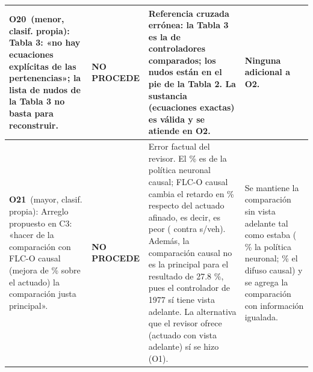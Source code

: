 \begin{longtable}{@{}p{7.4cm}p{2.1cm}p{8.4cm}p{7.3cm}@{}}
\midrule
\textbf{O20}\ (menor, clasif. propia): Tabla 3: «no hay ecuaciones explícitas de las pertenencias»; la lista de nudos de la Tabla 3 no basta para reconstruir.\par\smallskip{\itshape Ubicaci\'on citada: Sec. 8 (Tabla 3)} & \cellcolor{okrojo}\textbf{NO PROCEDE} & Referencia cruzada errónea: la Tabla 3 es la de controladores comparados; los nudos están en el pie de la Tabla 2. La sustancia (ecuaciones exactas) es válida y se atiende en O2. & Ninguna adicional a O2.\par\smallskip{\itshape Queda en: Tabla 2 (p. 6)} \\
\midrule
\textbf{O21}\ (mayor, clasif. propia): Arreglo propuesto en C3: «hacer de la comparación con FLC-O causal (mejora de \RedActMlpC{} \% sobre el actuado) la comparación justa principal».\par\smallskip{\itshape Ubicaci\'on citada: C3; Sec. 5, punto 1} & \cellcolor{okrojo}\textbf{NO PROCEDE} & Error factual del revisor. El \RedActMlpC{} \% es de la política neuronal causal; FLC-O causal cambia el retardo en \RedActFlcC{} \% respecto del actuado afinado, es decir, es peor (\DelayOfFlcC{} contra \DelayOfActAf{} s/veh). Además, la comparación causal no es la principal para el resultado de 27.8 \%, pues el controlador de 1977 sí tiene vista adelante. La alternativa que el revisor ofrece (actuado con vista adelante) sí se hizo (O1). & Se mantiene la comparación sin vista adelante tal como estaba (\RedActMlpC{} \% la política neuronal; \RedActFlcC{} \% el difuso causal) y se agrega la comparación con información igualada.\par\smallskip{\itshape Queda en: Sec. VIII-C (p. 8)} \\
\midrule
\bottomrule
\end{longtable}
\endgroup
